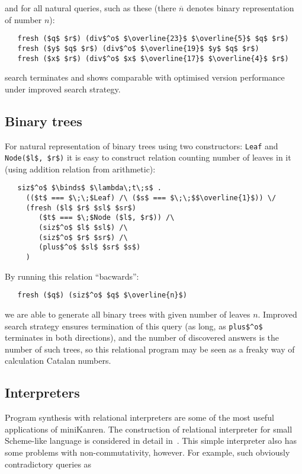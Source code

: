 \noindent and for all natural queries, such as these (there $\overline{n}$ denotes binary representation of number $n$):

\begin{lstlisting}
   fresh ($q$ $r$) (div$^o$ $\overline{23}$ $\overline{5}$ $q$ $r$)
   fresh ($y$ $q$ $r$) (div$^o$ $\overline{19}$ $y$ $q$ $r$)
   fresh ($x$ $r$) (div$^o$ $x$ $\overline{17}$ $\overline{4}$ $r$)
\end{lstlisting}

\noindent search terminates and shows comparable with optimised version performance under improved search strategy.

\subsection{Binary trees}

For natural representation of binary trees using two constructors: \lstinline|Leaf| and \lstinline|Node($l$, $r$)| it is easy to construct relation counting number of leaves in it (using addition relation from arithmetic):

\begin{lstlisting}
   siz$^o$ $\binds$ $\lambda\;t\;s$ .
     (($t$ === $\;\;$Leaf) /\ ($s$ === $\;\;$$\overline{1}$)) \/
     (fresh ($l$ $r$ $sl$ $sr$)
        ($t$ === $\;$Node ($l$, $r$)) /\
        (siz$^o$ $l$ $sl$) /\
        (siz$^o$ $r$ $sr$) /\
        (plus$^o$ $sl$ $sr$ $s$)
     )
\end{lstlisting}

By running this relation ``bacwards'':

\begin{lstlisting}
   fresh ($q$) (siz$^o$ $q$ $\overline{n}$)
\end{lstlisting}

\noindent we are able to generate all binary trees with given number of leaves $n$. Improved search strategy ensures termination of this query (as long, as \lstinline|plus$^o$| terminates in both directions), and the number of discovered answers is the number of such trees, so this relational program may be seen as a freaky way of calculation Catalan numbers.

\subsection{Interpreters}

Program synthesis with relational interpreters are some of the most useful applications of miniKanren. The construction of relational interpreter for small Scheme-like language is considered 
in detail in~\cite{Untagged}. This simple interpreter also has some problems with non-commutativity, however. For example, such obviously contradictory queries as

